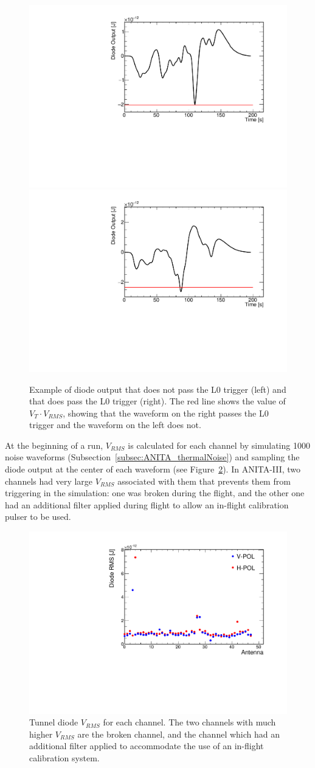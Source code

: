 \begin{figure}[!h]\centering
  \includegraphics[width=.45\linewidth]{./Figs/ExampleDiodeOutput_NOpass.pdf}
  \includegraphics[width=.45\linewidth]{./Figs/ExampleDiodeOutput_pass.pdf}
  \caption{Example of diode output that does not pass the L0 trigger (left) and that does pass the L0 trigger (right). The red
    line shows the value of $V_T \cdot V_{RMS}$, showing that the
    waveform on the right passes the L0 trigger and the waveform on
    the left does not.}
  \label{fig:ANITA_diodeOutput}
\end{figure}

At the beginning of a run, $V_{RMS}$ is calculated for each channel 
by simulating 1000 noise waveforms
(Subsection~\ref{subsec:ANITA_thermalNoise}) 
and sampling the diode output at the center of each waveform
(see Figure~\ref{fig:ANITA_diodeRMS}).
In ANITA-III, two channels had very large $V_{RMS}$ associated with them that prevents them from triggering in the simulation: one was broken during the flight, and the other one had an additional filter applied during flight to
allow an in-flight calibration pulser to be used.

\begin{figure}[!h]\centering
  \includegraphics[width=.45\linewidth]{./Figs/DiodeRMSfromFile.pdf}
  \caption{Tunnel diode $V_{RMS}$ for each channel. The two channels with much higher $V_{RMS}$ are the broken channel, and the channel which had an additional filter applied to accommodate the use of an in-flight calibration system.}
  \label{fig:ANITA_diodeRMS}
\end{figure}
 
